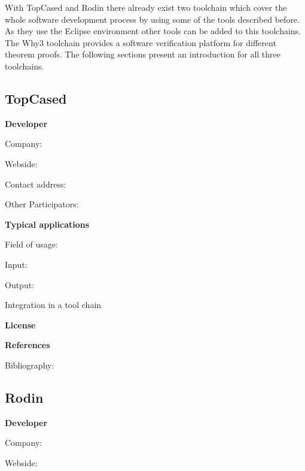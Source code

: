 \documentclass{./template/openetcs2}
\begin{document}
With TopCased and Rodin there already exist two toolchain which cover the whole software development process by using some of the tools described before. As they use the Eclipse environment other tools can be added to this toolchains. The Why3 toolchain provides a software verification platform for different theorem proofs. The following sections present an introduction for all three toolchains.

\subsection{TopCased}

	\textbf{Developer}

	Company: 

	Webside:

	Contact address:

	Other  Participators:



	\textbf{Typical applications}

	Field of usage:


	Input:

	Output:





	Integration in a tool chain



	\textbf{License}


	\textbf{References}

	Bibliography:

\subsection{Rodin}

	\textbf{Developer}

	Company: 

	Webside:
\end{document}
